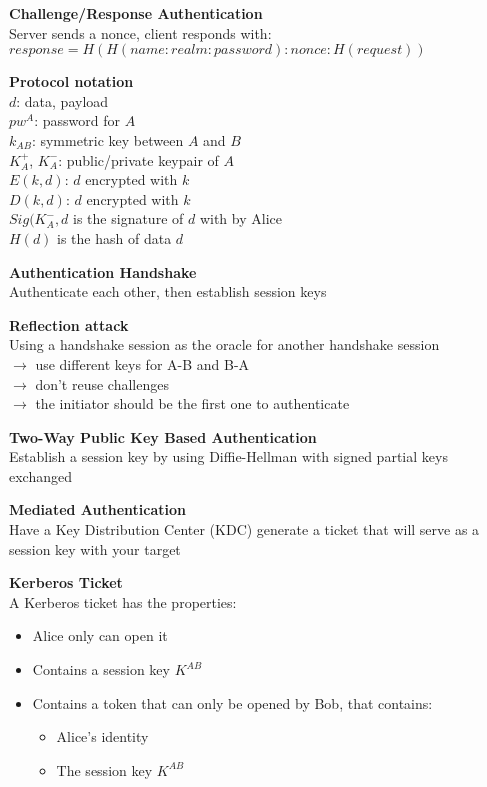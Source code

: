 \documentclass[10pt,letterpaper,landscape]{report}
\newcommand{\boxheight}{21.59cm}
\newcommand{\boxwidth}{8.85cm}
\begin{document}
\begin{small}
{\begin{minipage}[t][\boxheight][c]{\boxwidth}
		\textbf{Challenge/Response Authentication} \\
		Server sends a nonce, client responds with: \\ $response = H(H(name:realm:password):nonce:H(request))$
		
		\textbf{Protocol notation}\\
		$d$: data, payload\\
		$pw^A$: password for $A$\\
		$k_{AB}$: symmetric key between $A$ and $B$\\
		$K_A^+$, $K_A^-$: public/private keypair of $A$\\
		$E(k, d)$: $d$ encrypted with $k$\\
		$D(k, d)$: $d$ encrypted with $k$\\
		$Sig(K_A^-, d$ is the signature of $d$ with by Alice\\
		$H(d)$ is the hash of data $d$
		
		\textbf{Authentication Handshake} \\
		Authenticate each other, then establish session keys
		
		\textbf{Reflection attack}\\
		Using a handshake session as the oracle for another handshake session\\
		$\rightarrow$ use different keys for A-B and B-A\\
		$\rightarrow$ don't reuse challenges \\
		$\rightarrow$ the initiator should be the first one to authenticate
		
		\textbf{Two-Way Public Key Based Authentication}\\
		Establish a session key by using Diffie-Hellman with signed partial keys exchanged
		
		\textbf{Mediated Authentication}\\
		Have a Key Distribution Center (KDC) generate a ticket that will serve as a session key with your target
		
		\textbf{Kerberos Ticket}\\
		A Kerberos ticket has the properties: 
		\begin{itemize}
		    \item Alice only can open it
		    \item Contains a session key $K^{AB}$
		    \item Contains a token that can only be opened by Bob, that contains: 
		    \begin{itemize}
		        \item Alice's identity
		        \item The session key $K^{AB}$
		    \end{itemize}
		\end{itemize}
		

\end{minipage}}
\end{small}
\end{document}
